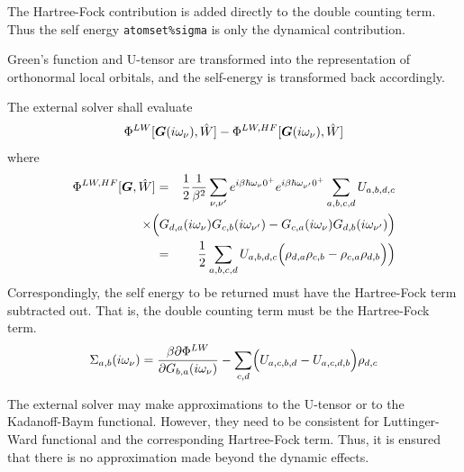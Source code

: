 \documentclass[11pt,a4paper]{report}
\begin{document}
\begin{enumerate}
  The Hartree-Fock contribution is added directly to the double
  counting term. Thus the self energy \verb|atomset%sigma| is only
  the dynamical contribution.

Green's function and U-tensor are transformed into the representation
of orthonormal local orbitals, and the self-energy is transformed back
accordingly.

The external solver shall evaluate
\begin{eqnarray}
\Phi^{LW}[\bm{G}(i\omega_\nu),\hat{W}]
-\Phi^{LW,HF}[\bm{G}(i\omega_\nu),\hat{W}]
\end{eqnarray}
where
\begin{eqnarray}
  \Phi^{LW,HF}[\mat{G},\hat{W}]
  &=&
  \frac{1}{2}
  \frac{1}{\beta^{2}} 
  \sum_{\nu,\nu'} e^{i \beta \hbar \omega_\nu 0^{+}} e^{i \beta \hbar \omega_{\nu'} 0^{+}}
  \sum_{a,b,c,d}
  U_{a,b,d,c} 
  \nonumber\\ 
  &&\hspace{-1.2cm}\times\Big(
  G_{d,a}(i\omega_\nu)G_{c,b}(i\omega_{\nu'})
  -  G_{c,a}(i\omega_\nu)G_{d,b}(i\omega_{\nu'})
  \Big) 
\nonumber\\
&=& \frac{1}{2}
  \sum_{a,b,c,d}
  U_{a,b,d,c} \Bigl(
  \rho_{d,a}\rho_{c,b} -  \rho_{c,a}\rho_{d,b}\Bigr)
  \Big) 
\end{eqnarray}
Correspondingly, the self energy to be returned must have the
Hartree-Fock term subtracted out. That is, the double counting term
must be the Hartree-Fock term.
\begin{eqnarray*}
\Sigma_{a,b}(i\omega_\nu)=\frac{\beta\partial\Phi^{LW}}
{\partial G_{b,a}(i\omega_\nu)}-\sum_{c,d}\Bigl(U_{a,c,b,d}-U_{a,c,d,b}\Bigr)
\rho_{d,c}
\end{eqnarray*}

The external solver may make approximations to the U-tensor or to the
Kadanoff-Baym functional. However, they need to be consistent for
Luttinger-Ward functional and the corresponding Hartree-Fock
term. Thus, it is ensured that there is no approximation made beyond
the dynamic effects.


\end{enumerate}
\end{document}
